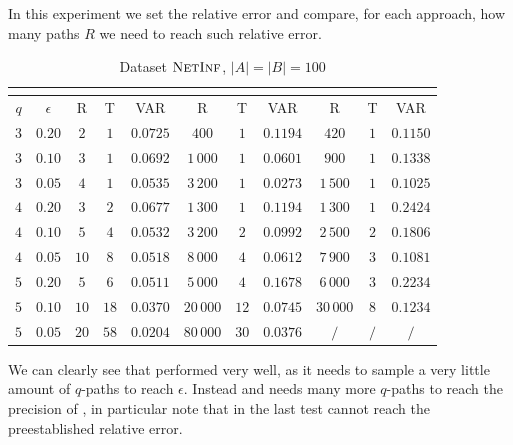 In this experiment we set the relative error and compare, for each approach, how many paths $R$ we need to reach such relative error.\medskip

\begin{table}[h]
	\centering
	\begin{tabular}{|c|c|c|c|c|c|c|c|c|c|c|}
		\cline{3-11}
		\multicolumn{2}{c|}{} & \multicolumn{3}{c|}{\fcount} & \multicolumn{3}{c|}{\fsamp} & \multicolumn{3}{c|}{\base}\\
		\hline	
		$q$ & $\epsilon$ & R    & T    & VAR      & R         & T    & VAR      & R         & T   & VAR      \\ \hline
		$3$ & $0.20$     & $2$  & $1$  & $0.0725$ & $400$     & $1$  & $0.1194$ & $420$     & $1$ & $0.1150$ \\ \hline
		$3$ & $0.10$     & $3$  & $1$  & $0.0692$ & $1\,000$  & $1$  & $0.0601$ & $900$     & $1$ & $0.1338$ \\ \hline
		$3$ & $0.05$     & $4$  & $1$  & $0.0535$ & $3\,200$  & $1$  & $0.0273$ & $1\,500$  & $1$ & $0.1025$ \\ \hline
		\hline
		$4$ & $0.20$     & $3$  & $2$  & $0.0677$ & $1\,300$  & $1$  & $0.1194$ & $1\,300$  & $1$ & $0.2424$ \\ \hline
		$4$ & $0.10$     & $5$  & $4$  & $0.0532$ & $3\,200$  & $2$  & $0.0992$ & $2\,500$  & $2$ & $0.1806$ \\ \hline
		$4$ & $0.05$     & $10$ & $8$  & $0.0518$ & $8\,000$  & $4$  & $0.0612$ & $7\,900$  & $3$ & $0.1081$ \\ \hline
		\hline
		$5$ & $0.20$     & $5$  & $6$  & $0.0511$ & $5\,000$  & $4$  & $0.1678$ & $6\,000$  & $3$ & $0.2234$ \\ \hline
		$5$ & $0.10$     & $10$ & $18$ & $0.0370$ & $20\,000$ & $12$ & $0.0745$ & $30\,000$ & $8$ & $0.1234$ \\ \hline
		$5$ & $0.05$     & $20$ & $58$ & $0.0204$ & $80\,000$ & $30$ & $0.0376$ & $/$       & $/$ & $/$      \\ \hline
	\end{tabular}
	\caption{Dataset $\textsc{NetInf}$, $|A| = |B| = 100$}
\end{table}
\medskip

We can clearly see that \fcount performed very well, as it needs to sample a very little amount of $q$-paths to reach $\epsilon$.
Instead \fsamp and \base needs many more $q$-paths to reach the precision of \fcount, in particular note that in the last test \base cannot reach the preestablished relative error.\bigskip

